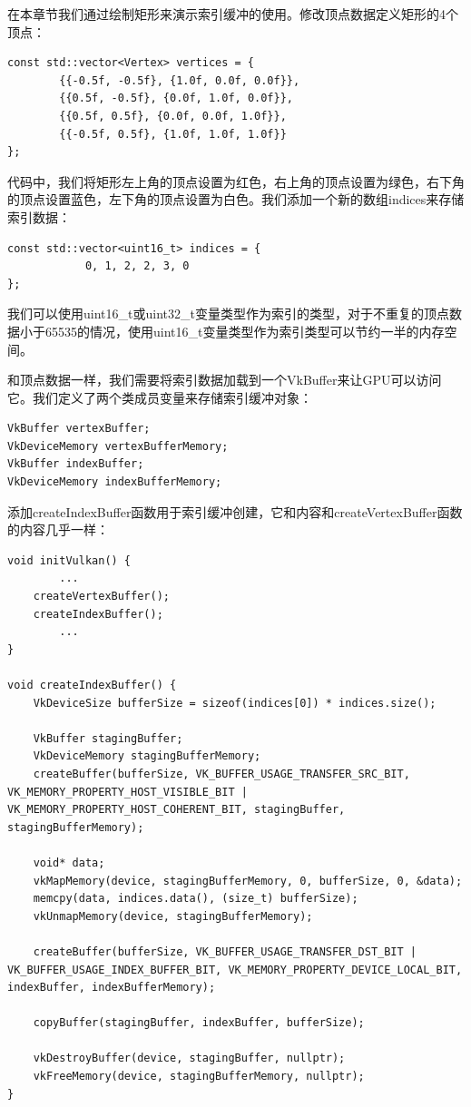 \documentclass{ctexart}
\begin{document}
在本章节我们通过绘制矩形来演示索引缓冲的使用。修改顶点数据定义矩形的4个顶点：

\begin{lstlisting}[language={[ANSI]C}]
const std::vector<Vertex> vertices = {
		{{-0.5f, -0.5f}, {1.0f, 0.0f, 0.0f}},
		{{0.5f, -0.5f}, {0.0f, 1.0f, 0.0f}},
		{{0.5f, 0.5f}, {0.0f, 0.0f, 1.0f}},
		{{-0.5f, 0.5f}, {1.0f, 1.0f, 1.0f}}
};
\end{lstlisting}

代码中，我们将矩形左上角的顶点设置为红色，右上角的顶点设置为绿色，右下角的顶点设置蓝色，左下角的顶点设置为白色。我们添加一个新的数组indices来存储索引数据：

\begin{lstlisting}[language={[ANSI]C}]
const std::vector<uint16_t> indices = {
			0, 1, 2, 2, 3, 0
};
\end{lstlisting}

我们可以使用uint16\_t或uint32\_t变量类型作为索引的类型，对于不重复的顶点数据小于65535的情况，使用uint16\_t变量类型作为索引类型可以节约一半的内存空间。

和顶点数据一样，我们需要将索引数据加载到一个VkBuffer来让GPU可以访问它。我们定义了两个类成员变量来存储索引缓冲对象：

\begin{lstlisting}[language={[ANSI]C}]
VkBuffer vertexBuffer;
VkDeviceMemory vertexBufferMemory;
VkBuffer indexBuffer;
VkDeviceMemory indexBufferMemory;
\end{lstlisting}

添加createIndexBuffer函数用于索引缓冲创建，它和内容和createVertexBuffer函数的内容几乎一样：

\begin{lstlisting}[language={[ANSI]C}]
void initVulkan() {
		...
	createVertexBuffer();
	createIndexBuffer();
		...
}

void createIndexBuffer() {
	VkDeviceSize bufferSize = sizeof(indices[0]) * indices.size();

	VkBuffer stagingBuffer;
	VkDeviceMemory stagingBufferMemory;
	createBuffer(bufferSize, VK_BUFFER_USAGE_TRANSFER_SRC_BIT, VK_MEMORY_PROPERTY_HOST_VISIBLE_BIT | VK_MEMORY_PROPERTY_HOST_COHERENT_BIT, stagingBuffer, stagingBufferMemory);

	void* data;
	vkMapMemory(device, stagingBufferMemory, 0, bufferSize, 0, &data);
	memcpy(data, indices.data(), (size_t) bufferSize);
	vkUnmapMemory(device, stagingBufferMemory);

	createBuffer(bufferSize, VK_BUFFER_USAGE_TRANSFER_DST_BIT | VK_BUFFER_USAGE_INDEX_BUFFER_BIT, VK_MEMORY_PROPERTY_DEVICE_LOCAL_BIT, indexBuffer, indexBufferMemory);

	copyBuffer(stagingBuffer, indexBuffer, bufferSize);

	vkDestroyBuffer(device, stagingBuffer, nullptr);
	vkFreeMemory(device, stagingBufferMemory, nullptr);
}
\end{lstlisting}
\end{document}
